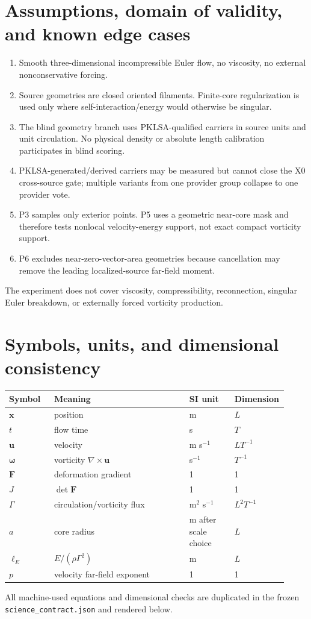 \documentclass[11pt,a4paper]{article}
\newcommand{\vort}{\boldsymbol{\omega}}
\newcommand{\vel}{\mathbf{u}}
\newcommand{\Fmat}{\mathbf{F}}
\begin{document}
\section{Assumptions, domain of validity, and known edge cases}
\begin{enumerate}[label=A\arabic*.]
\item Smooth three-dimensional incompressible Euler flow, no viscosity, no external nonconservative forcing.
\item Source geometries are closed oriented filaments. Finite-core regularization is used only where self-interaction/energy would otherwise be singular.
\item The blind geometry branch uses PKLSA-qualified carriers in source units and unit circulation. No physical density or absolute length calibration participates in blind scoring.
\item PKLSA-generated/derived carriers may be measured but cannot close the X0 cross-source gate; multiple variants from one provider group collapse to one provider vote.
\item P3 samples only exterior points. P5 uses a geometric near-core mask and therefore tests nonlocal velocity-energy support, not exact compact vorticity support.
\item P6 excludes near-zero-vector-area geometries because cancellation may remove the leading localized-source far-field moment.
\end{enumerate}
The experiment does not cover viscosity, compressibility, reconnection, singular Euler breakdown, or externally forced vorticity production.

\section{Symbols, units, and dimensional consistency}
\begin{longtable}{p{0.16\linewidth}p{0.48\linewidth}p{0.16\linewidth}p{0.12\linewidth}}
\toprule
Symbol & Meaning & SI unit & Dimension \\
\midrule
$\mathbf{x}$ & position & m & $L$ \\
$t$ & flow time & s & $T$ \\
$\vel$ & velocity & m s$^{-1}$ & $LT^{-1}$ \\
$\vort$ & vorticity $\nabla\times\vel$ & s$^{-1}$ & $T^{-1}$ \\
$\Fmat$ & deformation gradient & 1 & 1 \\
$J$ & $\det\Fmat$ & 1 & 1 \\
$\Gamma$ & circulation/vorticity flux & m$^2$ s$^{-1}$ & $L^2T^{-1}$ \\
$a$ & core radius & m after scale choice & $L$ \\
$\ell_E$ & $E/(\rho\Gamma^2)$ & m & $L$ \\
$p$ & velocity far-field exponent & 1 & 1 \\
\bottomrule
\end{longtable}
All machine-used equations and dimensional checks are duplicated in the frozen \texttt{science\_contract.json} and rendered below.
\end{document}
